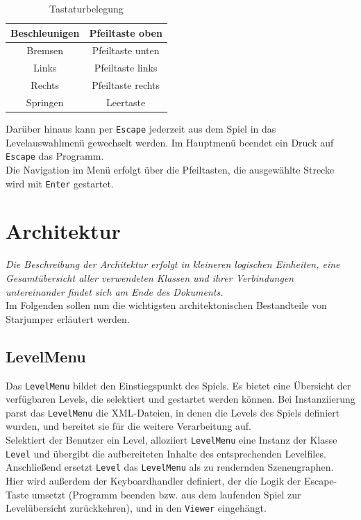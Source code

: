 \documentclass{llncs}
\begin{document}
\begin{table}[H]
	\begin{center}
		\begin{tabular}{|c|c|}
			\hline
			Beschleunigen & Pfeiltaste oben \\
			\hline
			Bremsen & Pfeiltaste unten \\
			\hline
			Links & Pfeiltaste links \\
			\hline
			Rechts & Pfeiltaste rechts \\
			\hline
			Springen & Leertaste \\
			\hline
		\end{tabular}
	\end{center}
	\caption{Tastaturbelegung}
\end{table}
\noindent Dar\"uber hinaus kann per \texttt{Escape} jederzeit aus dem Spiel in das Levelauswahlmen\"u
gewechselt werden. Im Hauptmen\"u beendet ein Druck auf \texttt{Escape} das Programm.\\
Die Navigation im Men\"u erfolgt \"uber die Pfeiltasten, die ausgew\"ahlte Strecke wird mit \texttt{Enter} gestartet.


\section{Architektur}

\textit{Die Beschreibung der Architektur erfolgt in kleineren logischen Einheiten, eine Gesamt\"ubersicht
aller verwendeten Klassen und ihrer Verbindungen untereinander findet sich am Ende des Dokuments.}\\
Im Folgenden sollen nun die wichtigsten architektonischen Bestandteile von Starjumper
erl\"autert werden.

\subsection{LevelMenu}
Das \texttt{LevelMenu} bildet den Einstiegspunkt des Spiels. Es bietet eine \"Ubersicht der verf\"ugbaren
Levels, die selektiert und gestartet werden k\"onnen. Bei Instanziierung parst das \texttt{LevelMenu} die
XML-Dateien, in denen die Levels des Spiels definiert wurden, und bereitet sie f\"ur die weitere Verarbeitung auf.\\
Selektiert der Benutzer ein Level, alloziiert \texttt{LevelMenu} eine Instanz der Klasse \texttt{Level} und
\"ubergibt die aufbereiteten Inhalte des entsprechenden Levelfiles. Anschlie\ss end ersetzt \texttt{Level}
das \texttt{LevelMenu} als zu rendernden Szenengraphen.\\
Hier wird au\ss erdem der Keyboardhandler definiert, der die Logik der Escape-Taste umsetzt (Programm beenden
bzw. aus dem laufenden Spiel zur Level\"ubersicht zur\"uckkehren), und in den \texttt{Viewer} eingeh\"angt.\\
\end{document}
